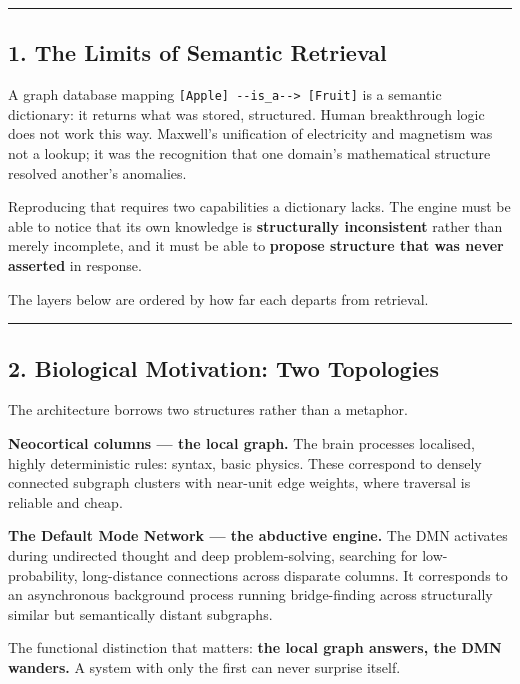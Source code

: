 \documentclass[
  11pt,
  a4paper,
]{article}
\begin{document}
\begin{center}\rule{0.5\linewidth}{0.5pt}\end{center}

\subsection{1. The Limits of Semantic
Retrieval}\label{the-limits-of-semantic-retrieval}

A graph database mapping
\texttt{{[}Apple{]}\ -\/-is\_a-\/-\textgreater{}\ {[}Fruit{]}} is a
semantic dictionary: it returns what was stored, structured. Human
breakthrough logic does not work this way. Maxwell's unification of
electricity and magnetism was not a lookup; it was the recognition that
one domain's mathematical structure resolved another's anomalies.

Reproducing that requires two capabilities a dictionary lacks. The
engine must be able to notice that its own knowledge is
\textbf{structurally inconsistent} rather than merely incomplete, and it
must be able to \textbf{propose structure that was never asserted} in
response.

The layers below are ordered by how far each departs from retrieval.

\begin{center}\rule{0.5\linewidth}{0.5pt}\end{center}

\subsection{2. Biological Motivation: Two
Topologies}\label{biological-motivation-two-topologies}

The architecture borrows two structures rather than a metaphor.

\textbf{Neocortical columns --- the local graph.} The brain processes
localised, highly deterministic rules: syntax, basic physics. These
correspond to densely connected subgraph clusters with near-unit edge
weights, where traversal is reliable and cheap.

\textbf{The Default Mode Network --- the abductive engine.} The DMN
activates during undirected thought and deep problem-solving, searching
for low-probability, long-distance connections across disparate columns.
It corresponds to an asynchronous background process running
bridge-finding across structurally similar but semantically distant
subgraphs.

The functional distinction that matters: \textbf{the local graph
answers, the DMN wanders.} A system with only the first can never
surprise itself.
\end{document}
